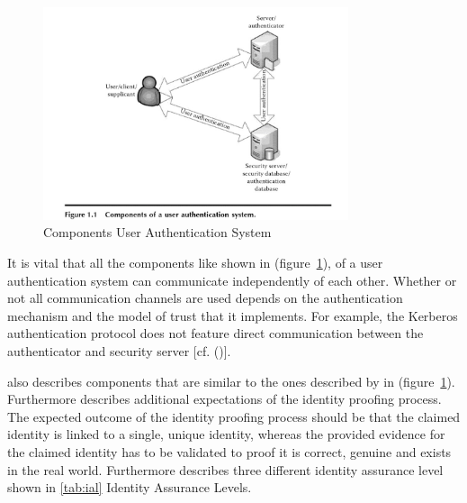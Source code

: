 \begin{figure}[h]
	\centering
	\includegraphics[width=0.8\textwidth]{images/componentsUserAuthenticationSystem}
	\caption[Componets Authentication]{Components User Authentication System}
	\label{fig:componentsuserauthenticationsystem}
\end{figure}


It is vital that all the components like shown in (figure~\ref{fig:componentsuserauthenticationsystem}), of a user authentication system can communicate independently of each other. Whether or not all communication channels are used depends on the authentication mechanism and the model of trust that it implements. For example, the Kerberos authentication protocol does not feature direct communication between the authenticator and security server [cf. (\cite{Todorov:2007:MUI})]. 

\cite{NIST:2017:DIGEIP} also describes components that are similar to the ones described by \cite{Todorov:2007:MUI} in (figure~\ref{fig:componentsuserauthenticationsystem}). Furthermore \cite{NIST:2017:DIGEIP} describes additional expectations of the identity proofing process. The expected outcome of the identity proofing process should be that the claimed identity is linked to a single, unique identity, whereas the provided evidence for the claimed identity has to be validated to proof it is correct, genuine and exists in the real world. Furthermore \cite{NIST:2017:DIGEIP} describes three different identity assurance level shown in \ref{tab:ial} Identity Assurance Levels.


